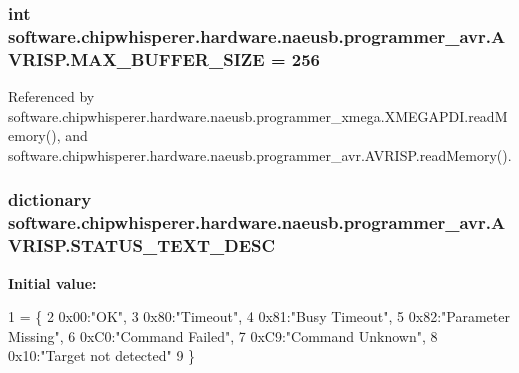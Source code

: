 \subsubsection[{M\+A\+X\+\_\+\+B\+U\+F\+F\+E\+R\+\_\+\+S\+I\+Z\+E}]{\setlength{\rightskip}{0pt plus 5cm}int software.\+chipwhisperer.\+hardware.\+naeusb.\+programmer\+\_\+avr.\+A\+V\+R\+I\+S\+P.\+M\+A\+X\+\_\+\+B\+U\+F\+F\+E\+R\+\_\+\+S\+I\+Z\+E = 256\hspace{0.3cm}{\ttfamily [static]}}\label{classsoftware_1_1chipwhisperer_1_1hardware_1_1naeusb_1_1programmer__avr_1_1AVRISP_a07f57a817d0764c6b3d37a1a1171ab1c}


Referenced by software.\+chipwhisperer.\+hardware.\+naeusb.\+programmer\+\_\+xmega.\+X\+M\+E\+G\+A\+P\+D\+I.\+read\+Memory(), and software.\+chipwhisperer.\+hardware.\+naeusb.\+programmer\+\_\+avr.\+A\+V\+R\+I\+S\+P.\+read\+Memory().

\hypertarget{classsoftware_1_1chipwhisperer_1_1hardware_1_1naeusb_1_1programmer__avr_1_1AVRISP_ab2178dc6b2bc0b67b2b306f35934c517}{}
\subsubsection[{S\+T\+A\+T\+U\+S\+\_\+\+T\+E\+X\+T\+\_\+\+D\+E\+S\+C}]{\setlength{\rightskip}{0pt plus 5cm}dictionary software.\+chipwhisperer.\+hardware.\+naeusb.\+programmer\+\_\+avr.\+A\+V\+R\+I\+S\+P.\+S\+T\+A\+T\+U\+S\+\_\+\+T\+E\+X\+T\+\_\+\+D\+E\+S\+C\hspace{0.3cm}{\ttfamily [static]}}\label{classsoftware_1_1chipwhisperer_1_1hardware_1_1naeusb_1_1programmer__avr_1_1AVRISP_ab2178dc6b2bc0b67b2b306f35934c517}
{\bfseries Initial value\+:}
\begin{DoxyCode}
1 = \{
2         0x00:\textcolor{stringliteral}{"OK"},
3         0x80:\textcolor{stringliteral}{"Timeout"},
4         0x81:\textcolor{stringliteral}{"Busy Timeout"},
5         0x82:\textcolor{stringliteral}{"Parameter Missing"},
6         0xC0:\textcolor{stringliteral}{"Command Failed"},
7         0xC9:\textcolor{stringliteral}{"Command Unknown"},
8         0x10:\textcolor{stringliteral}{"Target not detected"}
9     \}
\end{DoxyCode}


